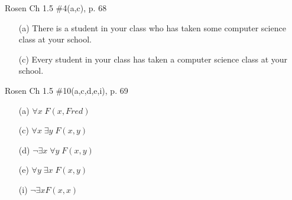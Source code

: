 \begin{questions}
 Rosen Ch 1.5 \#4(a,c), p. 68
    \ifprintanswers
        \vspace{-12pt}
    \fi
  \begin{solution}
      \begin{itemize}[itemsep=0pt,parsep=0pt,topsep=0pt,partopsep=0pt]
         \item[(a)] There is a student in your class who has taken some computer science class at your school.
         \item[(c)] Every student in your class has taken a computer science class at your school.
      \end{itemize}
  \end{solution}




 Rosen Ch 1.5 \#10(a,c,d,e,i), p. 69
    \ifprintanswers
        \vspace{-12pt}
    \fi
  \begin{solution}
      \begin{itemize}[itemsep=0pt,parsep=0pt,topsep=0pt,partopsep=0pt]
         \item[(a)] $\forall x\; F(x,Fred)$
          \item[(c)] $\forall x\; \exists y\; F(x,y)$
         \item[(d)] $\neg \exists x\; \forall y\; F(x,y)$
         \item[(e)] $ \forall y\; \exists x\; F(x,y)$
         \item[(i)] $\neg \exists x F(x,x)$
      \end{itemize}
  \end{solution}




\end{questions}

